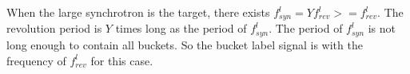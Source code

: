 When the large synchrotron is the target, there exists $f_{\mathit{syn}}^{l}=Yf_{\mathit{rev}}^{l}>=f_{\mathit{rev}}^{l}$. The revolution period is $Y$ times long as the period of $f_{\mathit{syn}}^{l}$. The period of $f_{\mathit{syn}}^{l}$ is not long enough to contain all buckets. So the bucket label signal is with the frequency of $f_{\mathit{rev}}^{l}$ for this case. 


